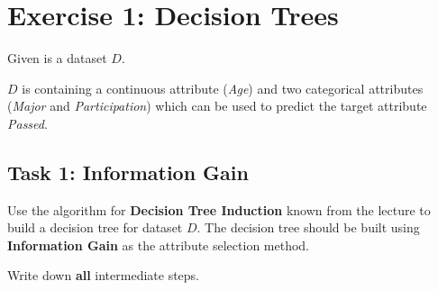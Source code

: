 \documentclass[
english,
smallborders
]{i6prcsht}
\begin{document}
\section*{Exercise 1: Decision Trees}

\begin{minipage}{.5\textwidth}
	Given is a dataset $D$.
	
	\vspace*{0.5cm}
	
	$D$ is containing a continuous attribute (\textit{Age}) and two categorical attributes (\textit{Major} and \textit{Participation}) which can be used to predict the target attribute \textit{Passed}.
\end{minipage}
\begin{minipage}{.5\textwidth}
	\begin{flushright}	
	\end{flushright}
\end{minipage}

\subsection*{Task 1: Information Gain}

Use the algorithm for \textbf{Decision Tree Induction} known from the lecture to build a decision tree for dataset $D$. The decision tree should be built using \textbf{Information Gain} as the attribute selection method.

Write down \textbf{all} intermediate steps.
\end{document}
